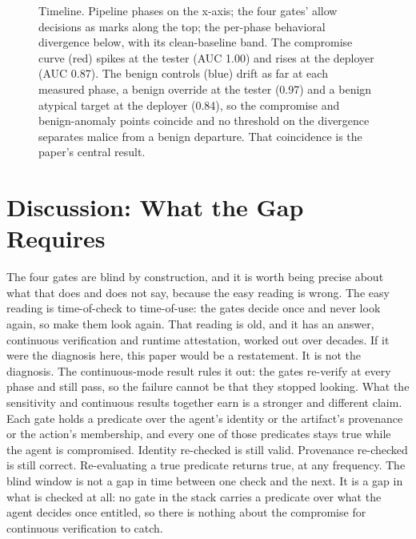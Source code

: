 \documentclass[conference]{IEEEtran}
\begin{document}
\begin{figure}[htbp]
{%
}
\caption{Timeline. Pipeline phases on the x-axis; the four gates' allow decisions as marks along the top; the per-phase behavioral divergence below, with its clean-baseline band. The compromise curve (red) spikes at the tester (AUC 1.00) and rises at the deployer (AUC 0.87). The benign controls (blue) drift as far at each measured phase, a benign override at the tester (0.97) and a benign atypical target at the deployer (0.84), so the compromise and benign-anomaly points coincide and no threshold on the divergence separates malice from a benign departure. That coincidence is the paper's central result.}
\label{fig:timeline}
\end{figure}

\section{Discussion: What the Gap Requires}\label{sec:discussion}

The four gates are blind by construction, and it is worth being precise about what that does and does not say, because the easy reading is wrong. The easy reading is time-of-check to time-of-use: the gates decide once and never look again, so make them look again. That reading is old, and it has an answer, continuous verification and runtime attestation, worked out over decades. If it were the diagnosis here, this paper would be a restatement. It is not the diagnosis. The continuous-mode result rules it out: the gates re-verify at every phase and still pass, so the failure cannot be that they stopped looking. What the sensitivity and continuous results together earn is a stronger and different claim. Each gate holds a predicate over the agent's identity or the artifact's provenance or the action's membership, and every one of those predicates stays true while the agent is compromised. Identity re-checked is still valid. Provenance re-checked is still correct. Re-evaluating a true predicate returns true, at any frequency. The blind window is not a gap in time between one check and the next. It is a gap in what is checked at all: no gate in the stack carries a predicate over what the agent decides once entitled, so there is nothing about the compromise for continuous verification to catch.
\end{document}
